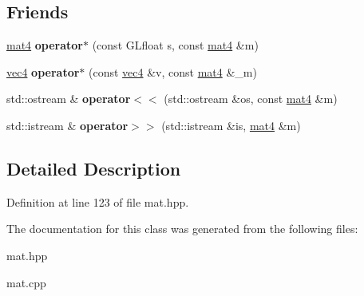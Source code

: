 \subsection*{Friends}
\begin{DoxyCompactItemize}
\item 
\hypertarget{class_angel_1_1mat4_aee74ba4512e3c59e8ed73764e4396d59}{\hyperlink{class_angel_1_1mat4}{mat4} {\bfseries operator$\ast$} (const G\-Lfloat s, const \hyperlink{class_angel_1_1mat4}{mat4} \&m)}\label{class_angel_1_1mat4_aee74ba4512e3c59e8ed73764e4396d59}

\item 
\hypertarget{class_angel_1_1mat4_a43eac2e676368c54279c3babf511fa6b}{\hyperlink{struct_angel_1_1vec4}{vec4} {\bfseries operator$\ast$} (const \hyperlink{struct_angel_1_1vec4}{vec4} \&v, const \hyperlink{class_angel_1_1mat4}{mat4} \&\-\_\-m)}\label{class_angel_1_1mat4_a43eac2e676368c54279c3babf511fa6b}

\item 
\hypertarget{class_angel_1_1mat4_ac079e857a3c74a1b974e4f4619e16adf}{std\-::ostream \& {\bfseries operator$<$$<$} (std\-::ostream \&os, const \hyperlink{class_angel_1_1mat4}{mat4} \&m)}\label{class_angel_1_1mat4_ac079e857a3c74a1b974e4f4619e16adf}

\item 
\hypertarget{class_angel_1_1mat4_a897b946d3a30dbddc811d486bfa4b61a}{std\-::istream \& {\bfseries operator$>$$>$} (std\-::istream \&is, \hyperlink{class_angel_1_1mat4}{mat4} \&m)}\label{class_angel_1_1mat4_a897b946d3a30dbddc811d486bfa4b61a}

\end{DoxyCompactItemize}


\subsection{Detailed Description}


Definition at line 123 of file mat.\-hpp.



The documentation for this class was generated from the following files\-:\begin{DoxyCompactItemize}
\item 
mat.\-hpp\item 
mat.\-cpp\end{DoxyCompactItemize}
